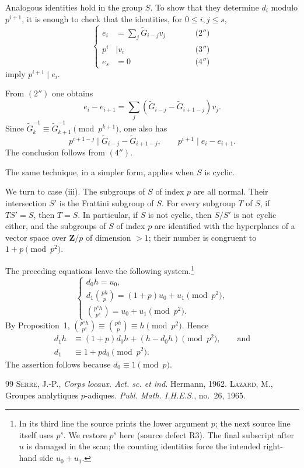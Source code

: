 \documentclass[12pt,reqno]{amsart}
\theoremstyle{plain}
\begin{document}
Analogous identities hold in the group $S$. To show that they determine $d_i$ modulo $p^{i+1}$, it is enough to check that the identities, for $0\leq i,j\leq s$,
\[
\left\{
\begin{alignedat}{2}
e_i&=\sum_j \widetilde G_{i-j}v_j &\qquad& \text{(2$''$)}\\
p^i&\mid v_i && \text{(3$''$)}\\
e_s&=0 && \text{(4$''$)}
\end{alignedat}
\right.
\]
imply $p^{i+1}\mid e_i$.

From $(2'')$ one obtains
\[
e_i-e_{i+1}=\sum_j (\widetilde G_{i-j}-\widetilde G_{i+1-j})v_j.
\]
Since $\widetilde G_k^{-1}\equiv \widetilde G_{k+1}^{-1}\pmod {p^{k+1}}$, one also has
\[
p^{i+1-j}\mid \widetilde G_{i-j}-\widetilde G_{i+1-j},\qquad p^{i+1}\mid e_i-e_{i+1}.
\]
The conclusion follows from $(4'')$.

The same technique, in a simpler form, applies when $S$ is cyclic.

We turn to case (iii). The subgroups of $S$ of index $p$ are all normal. Their intersection $S'$ is the Frattini subgroup of $S$. For every subgroup $T$ of $S$, if $TS'=S$, then $T=S$. In particular, if $S$ is not cyclic, then $S/S'$ is not cyclic either, and the subgroups of $S$ of index $p$ are identified with the hyperplanes of a vector space over $\mathbf Z/p$ of dimension $>1$; their number is congruent to $1+p\pmod {p^2}$.

The preceding equations leave the following system.\footnote{In its third
line the source prints the lower argument $p$; the next source line
itself uses $p^s$.  We restore $p^s$ here (source defect R3).  The final
subscript after $u$ is damaged in the scan; the counting identities force
the intended right-hand side $u_0+u_1$.}
\[
\begin{cases}
d_0 h=u_0,\\[4pt]
d_1\binom{ph}{p}=(1+p)u_0+u_1\pmod {p^2},\\[4pt]
\binom{p^s h}{p^s}=u_0+u_1\pmod {p^2}.
\end{cases}
\]
By Proposition~1,
$\binom{p^s h}{p^s}\equiv\binom{ph}{p}\equiv h\pmod {p^2}$. Hence
\begin{align*}
d_1h&\equiv (1+p)d_0h+(h-d_0h)\pmod {p^2},\qquad\text{and}\\
d_1&\equiv 1+pd_0\pmod {p^2}.
\end{align*}
The assertion follows because $d_0\equiv 1\pmod p$.

\begin{thebibliography}{99}
 \textsc{Serre, J.-P.}, \textit{Corps locaux. Act. sc. et ind.} Hermann, 1962.
 \textsc{Lazard, M.}, Groupes analytiques $p$-adiques. \textit{Publ. Math. I.H.E.S.}, no.~26, 1965.
\end{thebibliography}
\end{document}
